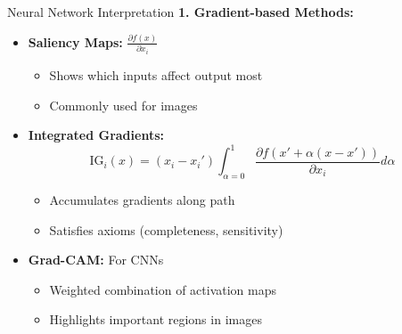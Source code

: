 \documentclass[aspectratio=169]{beamer}
\begin{document}
\begin{frame}{Neural Network Interpretation}
  \textbf{1. Gradient-based Methods:}

  \begin{itemize}
    \item \textbf{Saliency Maps:} $\frac{\partial f(x)}{\partial x_i}$
    \begin{itemize}
      \item Shows which inputs affect output most
      \item Commonly used for images
    \end{itemize}

    \item \textbf{Integrated Gradients:}
    \begin{equation}
      \text{IG}_i(x) = (x_i - x_i') \int_{\alpha=0}^1 \frac{\partial f(x' + \alpha(x - x'))}{\partial x_i} d\alpha
    \end{equation}
    \begin{itemize}
      \item Accumulates gradients along path
      \item Satisfies axioms (completeness, sensitivity)
    \end{itemize}

    \item \textbf{Grad-CAM:} For CNNs
    \begin{itemize}
      \item Weighted combination of activation maps
      \item Highlights important regions in images
    \end{itemize}
  \end{itemize}
\end{frame}
\end{document}
